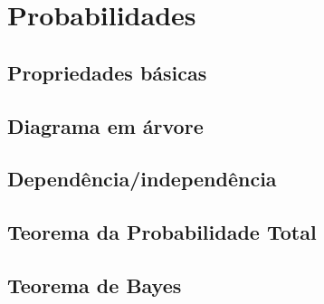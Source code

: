 \section{Probabilidades}

	\subsection{Propriedades básicas}

	\subsection{Diagrama em árvore}

	\subsection{Dependência/independência}

	\subsection{Teorema da Probabilidade Total}

	\subsection{Teorema de Bayes}